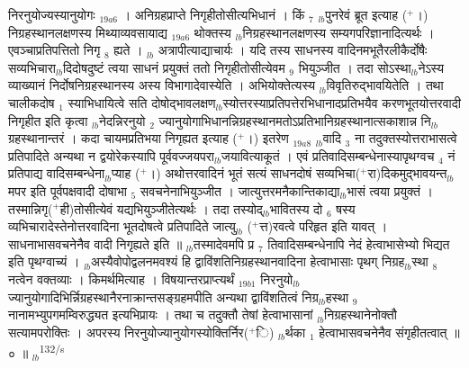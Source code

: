 \documentclass[article,12pt,a4paper]{memoir}%
\newcommand{\add}[1]{($^{+}$#1)}
\newcounter{parCount}
\begin{document}
	  
	  \pstart \leavevmode%
	\hphantom{.}{\color{DodgerBlue3}निरनुयोज्यस्यानुयोगः} {\tiny $_{19a6}$} । अनिग्रहप्राप्ते निगृहीतोसीत्यभिधानं । किं {\tiny $_{7}$} {\tiny $_{lb}$}पुनरेवं ब्रूत इत्याह \add{।} {\color{DodgerBlue3}निग्रहस्थानलक्षणस्य} मिथ्याव्यवसायाद्य {\tiny $_{19a6}$} थोक्तस्य {\tiny $_{lb}$}निग्रहस्थानलक्षणस्य सम्यगपरिज्ञानादित्यर्थः । एवञ्चाप्रतिपत्तितो निगृ {\tiny $_{8}$} ह्यते । {\tiny $_{lb}$} \leavevmode{} अत्रापीत्याद्याचार्यः । यदि तस्य साधनस्य वादिनमभूतैरलीकैर्दोषैः सव्यभिचारा{\tiny $_{lb}$}दिदोषदुष्टं त्वया साधनं प्रयुक्तं ततो निगृहीतोसीत्येवम {\tiny $_{9}$} भियुञ्जीत । तदा सोऽस्था{\tiny $_{lb}$}नेऽस्य व्याख्यानं निर्दोषनिग्रहस्थानस्य अस्य विभागादेवास्येति । अभियोक्तेत्यस्य {\tiny $_{lb}$}विवृतिरुद्भावयितेति । तथा चालीकदोष {\tiny $_{1}$} स्याभिधायित्वे सति दोषोद्भावलक्षण{\tiny $_{lb}$}स्योत्तरस्याप्रतिपत्तेरभिधानादप्रतिभयैव करणभूतयोत्तरवादी निगृहीत इति कृत्वा {\tiny $_{lb}$}नेदन्निरनुयो {\tiny $_{2}$} ज्यानुयोगाभिधानन्निग्रहस्थानमतोऽप्रतिभानिग्रहस्थानात्सकाशान्न नि{\tiny $_{lb}$}ग्रहस्थानान्तरं । कदा चायमप्रतिभया निगृह्यत इत्याह \add{।} {\color{DodgerBlue3}इतरेण} {\tiny $_{19a8}$} {\tiny $_{lb}$}वादि {\tiny $_{3}$} ना तदुक्तस्योत्तराभासत्वे प्रतिपादिते अन्यथा न द्वयोरेकस्यापि पूर्ववज्जयपरा{\tiny $_{lb}$}जयावित्याकूतं । एवं प्रतिवादिसम्बन्धेनास्यापृथग्वच {\tiny $_{4}$} नं प्रतिपाद्य वादिसम्बन्धेना{\tiny $_{lb}$}प्याह \add{।} अथोत्तरवादिनं भूतं सत्यं साधनदोषं सव्यभिचा\add{रा}दिकमुद्भावयन्त{\tiny $_{lb}$}मपर इति पूर्वपक्षवादी दोषाभा {\tiny $_{5}$} सवचनेनाभियुञ्जीत । जात्युत्तरमनैकान्तिकाद्या{\tiny $_{lb}$}भासं त्वया प्रयुक्तं । तस्मान्निगृ\add{ही}तोसीत्येवं यद्यभियुञ्जीतेत्यर्थः । तदा तस्योद्{\tiny $_{lb}$}भावितस्य दो {\tiny $_{6}$} षस्य व्यभिचारादेस्तेनोत्तरवादिना भूतदोषत्वे प्रतिपादिते जात्यु{\tiny $_{lb}$} \add{त्त}रवत्वे परिहृत इति यावत् । साधनाभासवचनेनैव वादी निगृह्यते इति ॥ {\tiny $_{lb}$}तस्मादेवमपि प्र {\tiny $_{7}$} तिवादिसम्बन्धेनापि नेदं हेत्वाभासेभ्यो भिद्यत इति पृथग्वाच्यं । {\tiny $_{lb}$}अस्यैवोपोद्वलनमवश्यं हि द्वाविंशतिनिग्रहस्थानवादिना हेत्वाभासाः पृथग् निग्रह{\tiny $_{lb}$}स्था {\tiny $_{8}$} नत्वेन वक्तव्याः । किमर्थमित्याह । विषयान्तरप्राप्त्यर्थं {\tiny $_{19b1}$} निरनुयो{\tiny $_{lb}$}ज्यानुयोगादिभिर्न्निग्रहस्थानैरनाक्रान्तसङ्ग्रहमपीति अन्यथा द्वाविंशतित्वं निग्र{\tiny $_{lb}$}हस्था {\tiny $_{9}$} \leavevmode{} नानामभ्युपगमम्विरुद्ध्यत इत्यभिप्रायः । तथा च तदुक्तौ तेषां हेत्वाभासानां {\tiny $_{lb}$}निग्रहस्थानेनोक्तौ सत्यामपरोक्तिः । अपरस्य निरनुयोज्यानुयोगस्योक्तिर्निर\add{ि} {\tiny $_{lb}$}र्थका {\tiny $_{1}$} हेत्वाभासवचनेनैव संगृहीतत्वात् ॥ ० ॥
	{}
	\pend%
      {\tiny $_{lb}$}\textsuperscript{\textenglish{132/s}}
\end{document}
